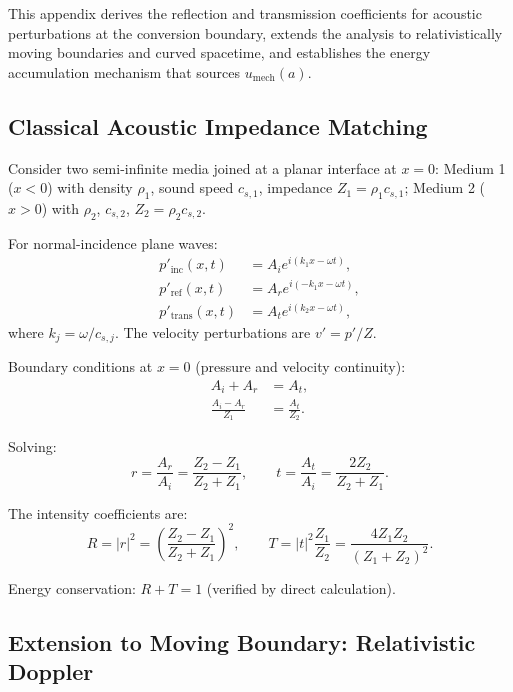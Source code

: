 \documentclass[11pt,a4paper]{article}
\theoremstyle{definition}
\begin{document}
This appendix derives the reflection and transmission coefficients for acoustic perturbations at the conversion boundary, extends the analysis to relativistically moving boundaries and curved spacetime, and establishes the energy accumulation mechanism that sources $u_{\mathrm{mech}}(a)$.

\subsection{Classical Acoustic Impedance Matching}
\label{app:classical_impedance}

Consider two semi-infinite media joined at a planar interface at $x = 0$: Medium 1 ($x < 0$) with density $\rho_1$, sound speed $c_{s,1}$, impedance $Z_1 = \rho_1 c_{s,1}$; Medium 2 ($x > 0$) with $\rho_2$, $c_{s,2}$, $Z_2 = \rho_2 c_{s,2}$.

For normal-incidence plane waves:
\begin{align}
p'_{\text{inc}}(x,t) &= A_i e^{i(k_1 x - \omega t)}, \\
p'_{\text{ref}}(x,t) &= A_r e^{i(-k_1 x - \omega t)}, \\
p'_{\text{trans}}(x,t) &= A_t e^{i(k_2 x - \omega t)},
\end{align}
where $k_j = \omega / c_{s,j}$. The velocity perturbations are $v' = p'/Z$.

Boundary conditions at $x = 0$ (pressure and velocity continuity):
\begin{align}
A_i + A_r &= A_t, \\
\frac{A_i - A_r}{Z_1} &= \frac{A_t}{Z_2}.
\end{align}

Solving:
\begin{equation}
r = \frac{A_r}{A_i} = \frac{Z_2 - Z_1}{Z_2 + Z_1}, \qquad t = \frac{A_t}{A_i} = \frac{2 Z_2}{Z_2 + Z_1}.
\end{equation}

The intensity coefficients are:
\begin{equation}
R = |r|^2 = \left( \frac{Z_2 - Z_1}{Z_2 + Z_1} \right)^2, \qquad T = |t|^2 \frac{Z_1}{Z_2} = \frac{4 Z_1 Z_2}{(Z_1 + Z_2)^2}.
\end{equation}

Energy conservation: $R + T = 1$ (verified by direct calculation).

\subsection{Extension to Moving Boundary: Relativistic Doppler}
\label{app:moving_boundary}
\end{document}

